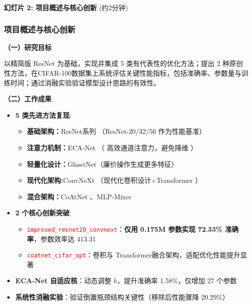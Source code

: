 \documentclass[10pt]{beamer}
\begin{document}
\begin{frame}{\textbf{幻灯片 2: 项目概述与核心创新} (约2分钟)}
\frametitle{项目概述与核心创新}

{\footnotesize
\textbf{（一）研究目标}

    以精简版 ResNet 为基础，实现并集成 5 类有代表性的优化方法；提出 2 种原创性方法，在CIFAR-100数据集上系统评估关键性能指标，包括准确率、参数量与训练时间；通过消融实验验证模型设计思路的有效性。
    
\textbf{（二）工作成果}
\begin{itemize}
    \item \textbf{5 类先进方法复现}:
        \begin{itemize}
            \item \footnotesize\textbf{基础架构：}ResNet系列  （ResNet-20/32/56 作为性能基准）\cite{He2016Deep}
            \item \textbf{注意力机制：}ECA-Net （ 高效通道注意力，避免降维 ）\cite{Wang_2020_CVPR}
            \item \textbf{轻量化设计：}GhostNet（廉价操作生成更多特征） \cite{Han2020GhostNet}
            \item \textbf{现代化架构:}ConvNeXt （现代化卷积设计+Transformer ）\cite{Liu2022ConvNet}
            \item \textbf{混合架构：}CoAtNet \cite{Dai2021CoAtNet}、MLP-Mixer\cite{Tolstikhin2021MLPMixer}
        \end{itemize}

    \item \textbf{2 个核心创新突破}:
        \begin{itemize}
            \item \footnotesize\textcolor{red}{\texttt{improved\_resnet20\_convnext}}：\textbf{仅用 0.175M 参数实现 72.33\% 准确率}，参数效率达 413.31
            \item \textcolor{red}{\texttt{coatnet\_cifar\_opt}}：卷积与 Transformer融合架构，适配优化性能提升显著
        \end{itemize}
    \item \footnotesize\textbf{ECA-Net 自适应核}：动态调整 $k$，提升准确率 1.58\%，仅增加 27 个参数
    \item \footnotesize\textbf{系统性消融实验}：验证倒置瓶颈结构关键性（移除后性能骤降 20.29\%）
\end{itemize}
}

\end{frame}




\end{document}

